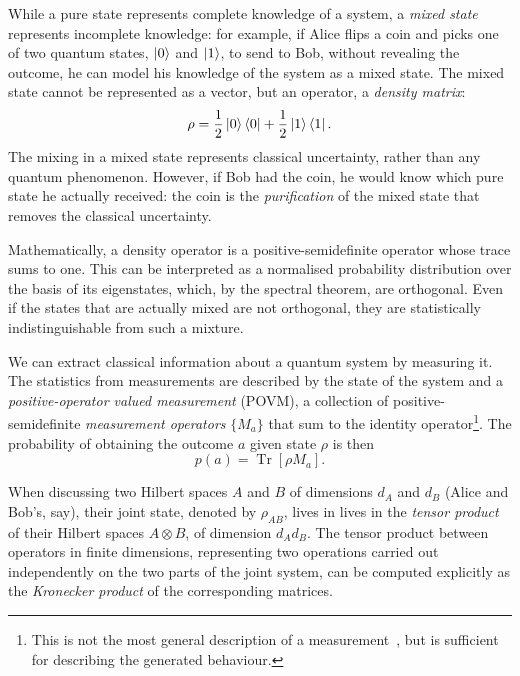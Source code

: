 \documentclass[10pt, a4paper]{article}
\numberwithin{equation}{section} %
\theoremstyle{definition}
\theoremstyle{plain}
\newcommand{\?}{\mathrel{?}} %
\newcommand{\Tr}[2][]{\mathop{\mathrm{Tr}#1}\left[ #2 \right]} %
\begin{document}
\begin{appendices}
                          While a pure state represents complete knowledge of a system, a \emph{mixed state} represents incomplete knowledge: for example, if Alice flips a coin and picks one of two quantum states, \(\ket{0}\) and \(\ket{1}\), to send to Bob, without revealing the outcome, he can model his knowledge of the system as a mixed state. The mixed state cannot be represented as a vector, but an operator, a \emph{density matrix}:
                          \[ \rho = \frac{1}{2} \ket{0}\bra{0} + \frac{1}{2} \ket{1}\bra{1}. \]
                          The mixing in a mixed state represents classical uncertainty, rather than any quantum phenomenon. However, if Bob had the coin, he would know which pure state he actually received: the coin is the \emph{purification} of the mixed state that removes the classical uncertainty.

                          Mathematically, a density operator is a positive-semidefinite operator whose trace sums to one. This can be interpreted as a normalised probability distribution over the basis of its eigenstates, which, by the spectral theorem, are orthogonal. Even if the states that are actually mixed are not orthogonal, they are statistically indistinguishable from such a mixture.

                          We can extract classical information about a quantum system by measuring it. The statistics from measurements are described by the state of the system and a \emph{positive-operator valued measurement} (POVM), a collection of positive-semidefinite \emph{measurement operators} \(\{M_a\}\) that sum to the identity operator\footnote{This is not the most general description of a measurement~\cite[Box 2.5]{NielsenChuang}, but is sufficient for describing the generated behaviour.}. The probability of obtaining the outcome \(a\) given state \(\rho\) is then
                          \begin{equation}
                            p(a) = \Tr{\rho M_a}.
                          \end{equation}

                          When discussing two Hilbert spaces \(A\) and \(B\) of dimensions \(d_A\) and \(d_B\) (Alice and Bob's, say), their joint state, denoted by \(\rho_{AB}\), lives in lives in the \emph{tensor product} of their Hilbert spaces \(A \otimes B\), of dimension \(d_A d_B\). The tensor product between operators in finite dimensions, representing two operations carried out independently on the two parts of the joint system, can be computed explicitly as the \emph{Kronecker product} of the corresponding matrices.


\end{appendices}
\end{document}
